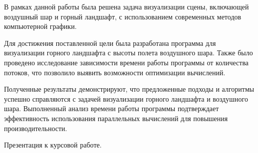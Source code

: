 
В рамках данной работы была решена задача визуализации сцены, включающей воздушный шар и горный ландшафт, с использованием современных методов компьютерной графики.

Для достижения поставленной цели была разработана программа для визуализации горного ландшафта с высоты полета воздушного шара. Также было проведено исследование зависимости времени работы программы от количества потоков, что позволило выявить возможности оптимизации вычислений.

Полученные результаты демонстрируют, что предложенные подходы и алгоритмы успешно справляются с задачей визуализации горного ландшафта и воздушного шара. Выполненный анализ времени работы программы подтверждает эффективность использования параллельных вычислений для повышения производительности.

\renewcommand\bibname{СПИСОК ИСПОЛЬЗОВАННЫХ ИСТОЧНИКОВ}



Презентация к курсовой работе.


